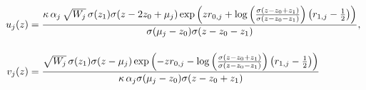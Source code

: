 \documentclass[11pt,a4paper]{article}
\numberwithin{equation}{section}
\begin{document}
\begin{align}
u_j{\left(z\right)} &= \frac{\kappa\, \alpha_j\,\sqrt{W_j} \,\sigma{\left(z_1\right)}\sigma{\left(z - 2 z_{0} + {\mu}_{j} \right)} \exp\left(z {r}_{0,j} + \log{\left(\frac{\sigma{\left(z - z_{0} + z_{1} \right)}}{\sigma{\left(z - z_{0} - z_{1} \right)}} \right)} \left({r}_{1,j} - \frac{1}{2}\right)\right)}{ \sigma{\left({\mu}_{j} - z_{0}\right)} \sigma{\left(z - z_{0}  - z_1\right)}}, \notag \\[12pt]
v_j{\left(z\right)} &= \frac{\sqrt{W_j} \,  \sigma{\left(z_1\right)}\sigma{\left(z - {\mu}_{j} \right)} \exp\left(- z {r}_{0,j} - \log{\left(\frac{\sigma{\left(z - z_{0} + z_{1} \right)}}{\sigma{\left(z - z_{0} - z_{1} \right)}} \right)}  \left({r}_{1,j} - \frac{1}{2}\right) \right)}{\kappa \,\alpha_j \sigma{\left({\mu}_{j} - z_{0}\right)} \sigma{\left(z - z_{0} + z_1\right)}} \label{cc:eq:u-v-quartic-no-wp-sqrt}
\end{align}
\end{document}
